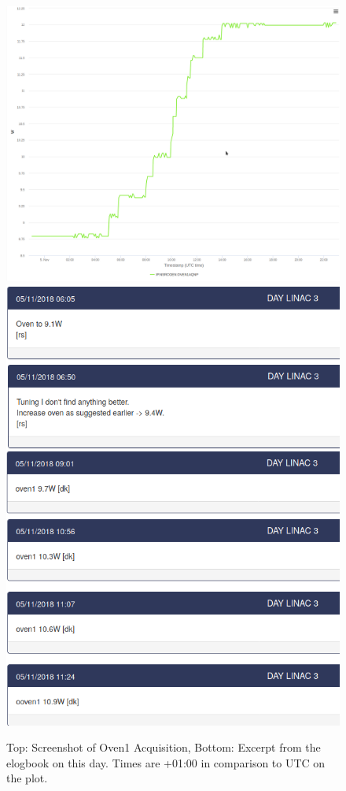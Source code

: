 \documentclass[12pt,a4paper]{article}
\begin{document}
\begin{figure}
\centering
\includegraphics{images/oven1example_05112018.png}
\includegraphics[width=!,totalheight=!,scale=1.7]{images/oven1example_logbook_05112018.png}
\caption{Top: Screenshot of Oven1 Acquisition, Bottom: Excerpt from the elogbook on this day. Times are +01:00 in comparison to UTC on the plot.}
\label{fig:elogbook}
\end{figure}
\end{document}
